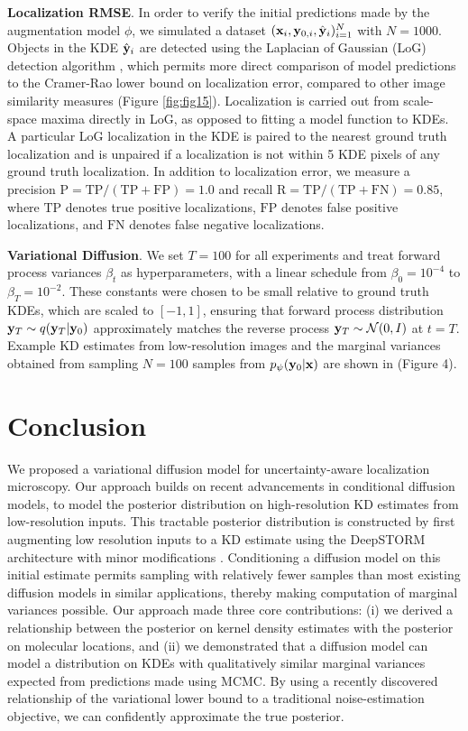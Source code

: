 \textbf{Localization RMSE}. In order to verify the initial predictions made by the augmentation model $\phi$, we simulated a dataset $(\bold{x}_i,\bold{y}_{0,i},\hat{\bold{y}}_{i})_{i=1}^{N}$ with $N=1000$. Objects in the KDE $\hat{\bold{y}}_{i}$  are detected using the Laplacian of Gaussian (LoG) detection algorithm \parencite{Kong2013}, which permits more direct comparison of model predictions to the Cramer-Rao lower bound on localization error, compared to other image similarity measures (Figure \ref{fig:fig15}). Localization is carried out from scale-space maxima directly in LoG, as opposed to fitting a model function to KDEs. A particular LoG localization in the KDE is paired to the nearest ground truth localization and is unpaired if a localization is not within 5 KDE pixels of any ground truth localization. In addition to localization error, we measure a precision $\mathrm{P = TP/(TP + FP)} = 1.0$ and recall $\mathrm{R = TP/(TP + FN)} = 0.85$, where $\mathrm{TP}$ denotes true positive localizations, $\mathrm{FP}$ denotes false positive localizations, and $\mathrm{FN}$ denotes false negative localizations.


\textbf{Variational Diffusion}. We set $T = 100$ for all experiments and treat forward process variances $\beta_{t}$ as hyperparameters, with a linear schedule from $\beta_{0}=10^{-4}$ to $\beta_{T}=10^{-2}$.
These constants were chosen to be small relative to ground truth KDEs, which are scaled to $[-1,1]$, ensuring that forward process distribution $\bold{y}_{T}\sim q(\bold{y}_{T}\lvert\bold{y}_{0})$ approximately matches the reverse process $\bold{y}_T\sim \mathcal{N}(0, I)$ at $t=T$. Example KD estimates from low-resolution images and the marginal variances obtained from sampling $N=100$ samples from $p_{\psi}(\bold{y}_{0}\lvert\bold{x})$ are shown in (Figure 4). 


\section{Conclusion}

We proposed a variational diffusion model for uncertainty-aware localization microscopy. Our approach builds on recent advancements in conditional diffusion models, to model the posterior distribution on high-resolution KD estimates from low-resolution inputs. This tractable posterior distribution is constructed by first augmenting low resolution inputs to a KD estimate using the DeepSTORM architecture with minor modifications \parencite{Nehme2020}. Conditioning a diffusion model on this initial estimate permits sampling with relatively fewer samples than most existing diffusion models in similar applications, thereby making computation of marginal variances possible. Our approach made three core contributions: (i) we derived a relationship between the posterior on kernel density estimates with the posterior on molecular locations, and (ii) we demonstrated that a diffusion model can model a distribution on KDEs with qualitatively similar marginal variances expected from predictions made using MCMC. By using a recently discovered relationship of the variational lower bound to a traditional noise-estimation objective, we can confidently approximate the true posterior.

